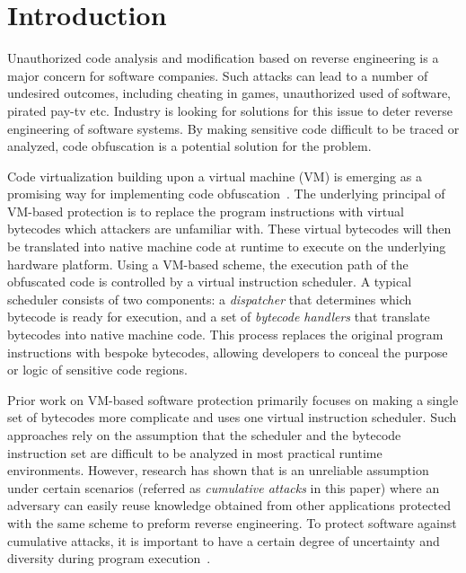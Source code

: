 \documentclass[conference]{IEEEtran}
\begin{document}
\section{Introduction}
Unauthorized code analysis and modification based on reverse engineering is a major concern for software companies.
Such attacks can lead to a number of undesired outcomes,
including cheating in games, unauthorized used of software, pirated pay-tv etc.
Industry is looking for solutions for this issue to deter reverse engineering of software systems.
By making sensitive code difficult to be traced or analyzed, code obfuscation is a potential solution for the problem.


Code virtualization building upon a virtual machine (VM) is emerging as a promising way for implementing code
obfuscation~\cite{1Themida,2CV,3Vmprotect,5fang2011multi,6ming2011software,7wang2014tdvmp,8wang2013nislvmp}.
The underlying principal of VM-based protection is to replace the program instructions with
virtual bytecodes which attackers are unfamiliar with.
These virtual bytecodes will then be translated into native machine code at runtime to execute on the underlying hardware platform.
Using a VM-based scheme, the execution path of the obfuscated code is controlled by a virtual instruction scheduler.
A typical scheduler consists of two components: a \emph{dispatcher} that determines which bytecode is ready for execution,
and a set of \emph{bytecode handlers} that translate bytecodes into native machine code.
This process replaces the original program instructions with bespoke bytecodes,
allowing developers to conceal the purpose or logic of sensitive code regions.


Prior work on VM-based software protection primarily focuses on making
a single set of bytecodes more complicate and uses one virtual instruction scheduler.
Such approaches rely on the assumption that the scheduler and the bytecode
instruction set are difficult to be analyzed in most practical runtime environments.
However, research has shown that is an unreliable assumption~\cite{10falliere2009inside}
under certain scenarios (referred as \emph{cumulative attacks} in this paper)
where an adversary can easily reuse knowledge obtained from other
applications protected with the same scheme to preform reverse engineering.
To protect software against cumulative attacks, it is important to have a certain degree of
uncertainty and diversity during program execution~\cite{4collberg}.
\end{document}
